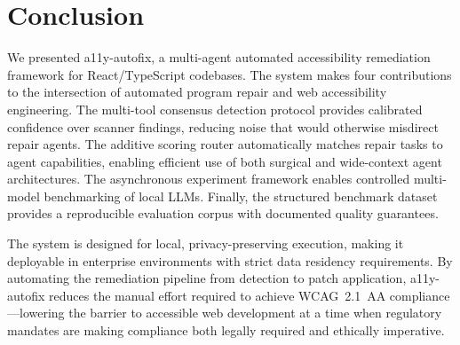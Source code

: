 \documentclass[10pt,conference]{IEEEtran}
\begin{document}
\section{Conclusion}
\label{sec:conclusion}

We presented a11y-autofix, a multi-agent automated accessibility remediation
framework for React/TypeScript codebases.  The system makes four contributions
to the intersection of automated program repair and web accessibility
engineering.  The multi-tool consensus detection protocol provides calibrated
confidence over scanner findings, reducing noise that would otherwise
misdirect repair agents.  The additive scoring router automatically matches
repair tasks to agent capabilities, enabling efficient use of both surgical
and wide-context agent architectures.  The asynchronous experiment framework
enables controlled multi-model benchmarking of local LLMs.  Finally, the
structured benchmark dataset provides a reproducible evaluation corpus with
documented quality guarantees.

The system is designed for local, privacy-preserving execution, making it
deployable in enterprise environments with strict data residency requirements.
By automating the remediation pipeline from detection to patch application,
a11y-autofix reduces the manual effort required to achieve WCAG~2.1~AA
compliance—lowering the barrier to accessible web development at a time when
regulatory mandates are making compliance both legally required and ethically
imperative.
\end{document}
